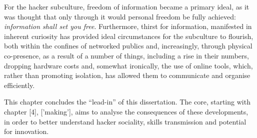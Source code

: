 For the hacker subculture, freedom of information became a primary ideal, as it was thought that only through it would personal freedom be fully achieved: \textit{information shall set you free}. Furthermore, thirst for information, manifested in inherent curiosity has provided ideal circumstances for the subculture to flourish, both within the confines of networked publics and, increasingly, through physical co-presence, as a result of a number of things, including a rise in their numbers, dropping hardware costs and, somewhat ironically, the use of online tools, which, rather than promoting isolation, has allowed them to communicate and organise efficiently.

This chapter concludes the ``lead-in'' of this dissertation. The core, starting with chapter [4], ['making'], aims to analyse the consequences of these developments, in order to better understand hacker sociality, skills transmission and potential for innovation.






